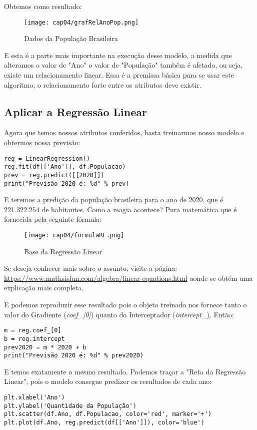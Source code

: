 Obtemos como resultado:
\begin{figure}[H]
	\centering
	\texttt{[image: cap04/grafRelAnoPop.png]}
	\caption{Dados da População Brasileira}
\end{figure}

E esta é a parte mais importante na execução desse modelo, a medida que alteramos o valor de "Ano" o valor de "População" também é afetado, ou seja, existe um relacionamento linear. Essa é a premissa básica para se usar este algoritmo, o relacionamento forte entre os atributos deve existir.

\subsection{Aplicar a Regressão Linear}

Agora que temos nossos atributos conferidos, basta treinarmos nosso modelo e obtermos nossa previsão:
\begin{lstlisting}[]
reg = LinearRegression()
reg.fit(df[['Ano']], df.Populacao)
prev = reg.predict([[2020]])
print("Previsão 2020 é: %d" % prev)
\end{lstlisting}

E teremos a predição da população brasileira para o ano de 2020, que é 221.322.254 de habitantes. Como a magia acontece? Pura matemática que é fornecida pela seguinte fórmula:
\begin{figure}[H]
	\centering
	\texttt{[image: cap04/formulaRL.png]}
	\caption{Base da Regressão Linear}
\end{figure}

\begin{note}{}
	Se deseja conhecer mais sobre o assunto, visite a página: \url{https://www.mathsisfun.com/algebra/linear-equations.html} aonde se obtém uma explicação mais completa.
\end{note}

E podemos reproduzir esse resultado pois o objeto treinado nos fornece tanto o valor do Gradiente (\textit{coef\_[0]}) quanto do Interceptador (\textit{intercept\_}). Então:
\begin{lstlisting}[]
m = reg.coef_[0]
b = reg.intercept_
prev2020 = m * 2020 + b
print("Previsão 2020 é: %d" % prev2020)
\end{lstlisting}

E temos exatamente o mesmo resultado. Podemos traçar a "Reta da Regressão Linear", pois o modelo consegue predizer os resultados de cada ano:
\begin{lstlisting}[]
plt.xlabel('Ano')
plt.ylabel('Quantidade da População')
plt.scatter(df.Ano, df.Populacao, color='red', marker='+')
plt.plot(df.Ano, reg.predict(df[['Ano']]), color='blue')
\end{lstlisting}

